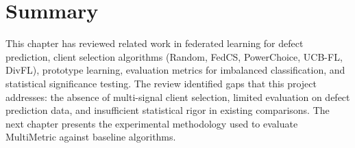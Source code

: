 \section{Summary}

This chapter has reviewed related work in federated learning for defect prediction, client selection algorithms (Random, FedCS, PowerChoice, UCB-FL, DivFL), prototype learning, evaluation metrics for imbalanced classification, and statistical significance testing. The review identified gaps that this project addresses: the absence of multi-signal client selection, limited evaluation on defect prediction data, and insufficient statistical rigor in existing comparisons. The next chapter presents the experimental methodology used to evaluate MultiMetric against baseline algorithms.
